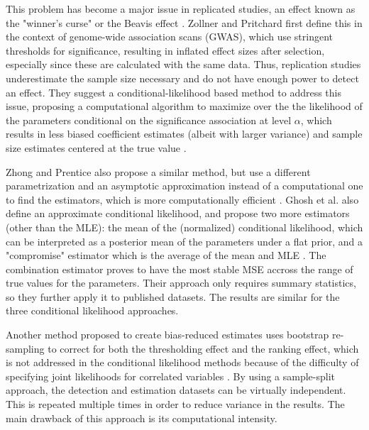 \documentclass[AMA,STIX1COL]{WileyNJD-v2}\usepackage[]{graphicx}\usepackage[]{color}
\begin{document}
This problem has become a major issue in replicated studies, an effect known as the "winner's curse" \cite{zollner2007overcoming} or the Beavis effect \cite{xu2003theoretical}. Zollner and Pritchard first define this in the context of genome-wide association scans (GWAS), which use stringent thresholds for significance, resulting in inflated effect sizes after selection, especially since these are calculated with the same data. Thus, replication studies underestimate the sample size necessary and do not have enough power to detect an effect. They suggest a conditional-likelihood based method to address this issue, proposing a computational algorithm to maximize over the the likelihood of the parameters conditional on the significance association at level $\alpha$, which results in less biased coefficient estimates (albeit with larger variance) and sample size estimates centered at the true value \cite{zollner2007overcoming}.

Zhong and Prentice also propose a similar method, but use a different parametrization and an asymptotic approximation instead of a computational one to find the estimators, which is more computationally efficient \cite{zhong2008bias}. Ghosh et al. also define an approximate conditional likelihood, and propose two more estimators (other than the MLE): the mean of the (normalized) conditional likelihood, which can be interpreted as a posterior mean of the parameters under a flat prior, and a "compromise" estimator which is the average of the mean and MLE \cite{ghosh2008estimating}. The combination estimator proves to have the most stable MSE accross the range of true values for the parameters. Their approach only requires summary statistics, so they further apply it to published datasets. The results are similar for the three conditional likelihood approaches.

Another method proposed to create bias-reduced estimates uses bootstrap re-sampling to correct for both the thresholding effect and the ranking effect, which is not addressed in the conditional likelihood methods because of the difficulty of specifying joint likelihoods for correlated variables \cite{sun2011br}. By using a sample-split approach, the detection and estimation datasets can be virtually independent. This is repeated multiple times in order to reduce variance in the results. The main drawback of this approach is its computational intensity.
\end{document}
